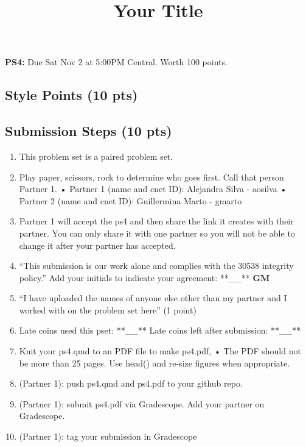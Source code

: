 \documentclass[
  letterpaper,
  DIV=11,
  numbers=noendperiod]{scrartcl}
\title{Your Title}
\author{}
\date{}
\providecommand{\tightlist}{%
  \setlength{\itemsep}{0pt}\setlength{\parskip}{0pt}}\usepackage{longtable,booktabs,array}
\begin{document}
\maketitle



\textbf{PS4:} Due Sat Nov 2 at 5:00PM Central. Worth 100 points.

\subsection{Style Points (10 pts)}\label{style-points-10-pts}

\subsection{Submission Steps (10 pts)}\label{submission-steps-10-pts}

\begin{enumerate}
\def\labelenumi{\arabic{enumi}.}
\tightlist
\item
  This problem set is a paired problem set.
\item
  Play paper, scissors, rock to determine who goes first. Call that
  person Partner 1. • Partner 1 (name and cnet ID): Alejandra Silva -
  aosilva • Partner 2 (name and cnet ID): Guillermina Marto - gmarto
\item
  Partner 1 will accept the ps4 and then share the link it creates with
  their partner. You can only share it with one partner so you will not
  be able to change it after your partner has accepted.
\item
  ``This submission is our work alone and complies with the 30538
  integrity policy.'' Add your initials to indicate your agreement:
  **\_\_** \textbf{GM}
\item
  ``I have uploaded the names of anyone else other than my partner and I
  worked with on the problem set here'' (1 point)
\item
  Late coins used this pset: **\_\_** Late coins left after submission:
  **\_\_**
\item
  Knit your ps4.qmd to an PDF file to make ps4.pdf, • The PDF should not
  be more than 25 pages. Use head() and re-size figures when
  appropriate.
\item
  (Partner 1): push ps4.qmd and ps4.pdf to your github repo.
\item
  (Partner 1): submit ps4.pdf via Gradescope. Add your partner on
  Gradescope.
\item
  (Partner 1): tag your submission in Gradescope
\end{enumerate}
\end{document}
